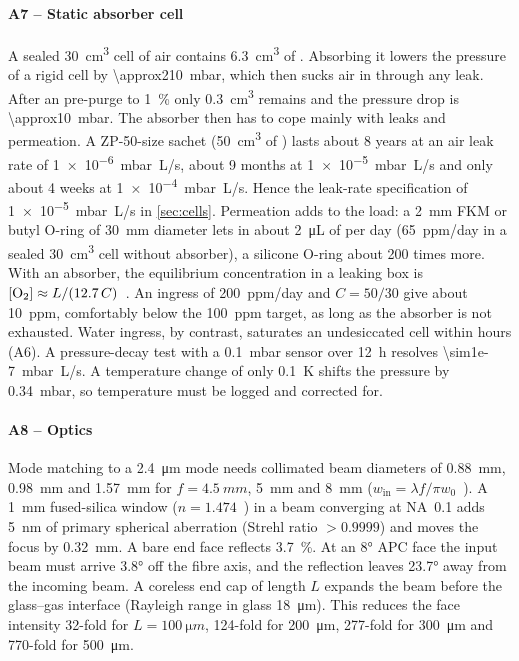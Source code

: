 \paragraph{A7 -- Static absorber cell} A sealed \SI{30}{cm^3} cell of air contains \SI{6.3}{cm^3} of
\Oxy. Absorbing it lowers the pressure of a rigid cell by \SI{\approx210}{mbar}, which then sucks air in
through any leak. After an \Ntwo{} pre-purge to \SI{1}{\percent} \Oxy{} only \SI{0.3}{cm^3} remains and the
pressure drop is \SI{\approx10}{mbar}. The absorber then has to cope mainly with leaks and permeation.
A ZP-50-size sachet (\SI{50}{cm^3} of \Oxy) lasts about 8 years at an air leak rate of
\SI{1e-6}{mbar.L/s}, about 9 months at \SI{1e-5}{mbar.L/s} and only about 4 weeks at
\SI{1e-4}{mbar.L/s}. Hence the leak-rate specification of \SI{1e-5}{mbar.L/s} in \cref{sec:cells}.
Permeation adds to the load: a \SI{2}{mm} FKM or butyl O-ring of \SI{30}{mm} diameter lets in about
\SI{2}{\micro L} of \Oxy{} per day (\SI{+65}{ppm/day} in a sealed \SI{30}{cm^3} cell without absorber), a
silicone O-ring about 200 times more. With an absorber, the equilibrium concentration in a leaking box is
$[\Oxy]\approx L/(12.7\,C)$~\cite{Lambert1992}. An ingress of \SI{200}{ppm/day} and $C=50/30$ give
about \SI{10}{ppm}, comfortably below the \SI{100}{ppm} target, as long as the absorber is not exhausted.
Water ingress, by contrast, saturates an undesiccated cell within hours (A6). A pressure-decay test with a
\SI{0.1}{mbar} sensor over \SI{12}{h} resolves \SI{\sim1e-7}{mbar.L/s}. A temperature change of only
\SI{0.1}{K} shifts the pressure by \SI{0.34}{mbar}, so temperature must be logged and corrected for.

\paragraph{A8 -- Optics} Mode matching to a \SI{2.4}{\micro m} mode needs collimated beam diameters of
\SI{0.88}{mm}, \SI{0.98}{mm} and \SI{1.57}{mm} for $f=\SI{4.5}{mm}$, \SI{5}{mm} and \SI{8}{mm}
($w_\text{in}=\lambda f/\pi w_0$~\cite{Kogelnik1966}). A \SI{1}{mm} fused-silica window
($n=1.474$~\cite{Malitson1965}) in a beam converging at NA~0.1 adds \SI{5}{nm} of primary spherical
aberration (Strehl ratio $>0.9999$) and moves the focus by \SI{0.32}{mm}. A bare end face reflects
\SI{3.7}{\percent}. At an \ang{8} APC face the input beam must arrive \ang{3.8} off the fibre axis, and
the reflection leaves \ang{23.7} away from the incoming beam. A coreless end cap of length $L$ expands
the beam before the glass--gas interface (Rayleigh range in glass \SI{18}{\micro m}). This reduces the
face intensity 32-fold for $L=\SI{100}{\micro m}$, 124-fold for \SI{200}{\micro m}, 277-fold for
\SI{300}{\micro m} and 770-fold for \SI{500}{\micro m}.

